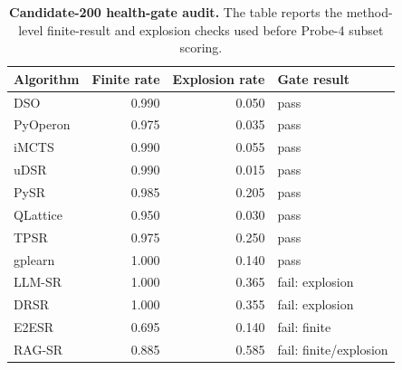 \begin{table}
\caption{\textbf{Candidate-200 health-gate audit.} The table reports the method-level finite-result and explosion checks used before Probe-4 subset scoring.}
\label{tab:table04_probe4_algorithm_health}
\begin{tabular}{lrrl}
\toprule
\textbf{Algorithm} & \textbf{Finite rate} & \textbf{Explosion rate} & \textbf{Gate result} \\
\midrule
DSO & 0.990 & 0.050 & pass \\
PyOperon & 0.975 & 0.035 & pass \\
iMCTS & 0.990 & 0.055 & pass \\
uDSR & 0.990 & 0.015 & pass \\
PySR & 0.985 & 0.205 & pass \\
QLattice & 0.950 & 0.030 & pass \\
TPSR & 0.975 & 0.250 & pass \\
gplearn & 1.000 & 0.140 & pass \\
LLM-SR & 1.000 & 0.365 & fail: explosion \\
DRSR & 1.000 & 0.355 & fail: explosion \\
E2ESR & 0.695 & 0.140 & fail: finite \\
RAG-SR & 0.885 & 0.585 & fail: finite/explosion \\
\bottomrule
\end{tabular}
\end{table}
